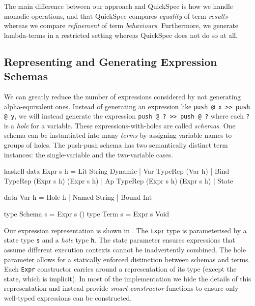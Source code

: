 The main difference between our approach and QuickSpec is how we
handle monadic operations, and that QuickSpec compares \emph{equality}
of term \emph{results} whereas we compare \emph{refinement} of term
\emph{behaviours}.  Furthermore, we generate lambda-terms in a
restricted setting whereas QuickSpec does not do so at all.

\subsection{Representing and Generating Expression Schemas}
\label{sec:coco-hiw-gen}

We can greatly reduce the number of expressions considered by not
generating alpha-equivalent ones.  Instead of generating an expression
like \verb|push @ x >> push @ y|, we will instead generate the
expression \verb|push @ ? >> push @ ?| where each \verb|?| is a
\emph{hole} for a variable.  These expressions-with-holes are called
\emph{schemas}.  One schema can be instantiated into many \emph{terms}
by assigning variable names to groups of holes.  The push-push schema
has two semantically distinct term instances: the single-variable and
the two-variable cases.

\begin{listing}
\centering
\begin{cminted}{haskell}
data Expr s h
  = Lit  String Dynamic
  | Var  TypeRep (Var h)
  | Bind TypeRep (Expr s h) (Expr s h)
  | Ap   TypeRep (Expr s h) (Expr s h)
  | State

data Var h = Hole h | Named String | Bound Int

type Schema s = Expr s ()
type Term   s = Expr s Void
\end{cminted}
\caption{Representation of Haskell expressions.}
\label{lst:exprrep}
\end{listing}

Our expression representation is shown in .  The
\verb|Expr| type is parameterised by a state type \verb|s| and a
\emph{hole} type \verb|h|.  The state parameter ensures expressions
that assume different execution contexts cannot be inadvertently
combined.  The hole parameter allows for a statically enforced
distinction between schemas and terms.  Each \verb|Expr| constructor
carries around a representation of its type (except the state, which
is implicit).  In most of the implementation we hide the details of
this representation and instead provide \emph{smart constructor}
functions to ensure only well-typed expressions can be constructed.

